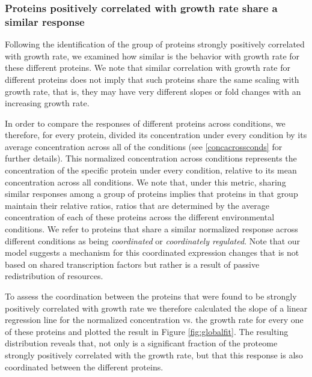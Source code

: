 \subsubsection{Proteins positively correlated with growth rate share a similar response}
\label{propchange} 

Following the identification of the group of proteins strongly positively correlated with growth rate, we examined how similar is the behavior with growth rate for these different proteins.
We note that similar correlation with growth rate for different proteins does not imply that such proteins share the same scaling with growth rate, that is,  they may have very different slopes or fold changes with an increasing growth rate.

In order to compare the responses of different proteins across conditions, we therefore, for every protein, divided its concentration under every condition by its average concentration across all of the conditions (see \ref{concacrossconds} for further details).
This normalized concentration across conditions represents the concentration of the specific protein under every condition, relative to its mean concentration across all conditions.
We note that, under this metric, sharing similar responses among a group of proteins implies that proteins in that group maintain their relative ratios, ratios that are determined by the average concentration of each of these proteins across the different environmental conditions.
We refer to proteins that share a similar normalized response across different conditions as being \emph{coordinated} or \emph{coordinately regulated}.
Note that our model suggests a mechanism for this coordinated expression changes that is not based on shared transcription factors but rather is a result of passive redistribution of resources.

To assess the coordination between the proteins that were found to be strongly positively correlated with growth rate we therefore calculated the slope of a linear regression line for the normalized concentration vs. the growth rate for every one of these proteins and plotted the result in Figure \ref{fig:globalfit}.
The resulting distribution reveals that, not only is a significant fraction of the proteome strongly positively correlated with the growth rate, but that this response is also coordinated between the different proteins.

